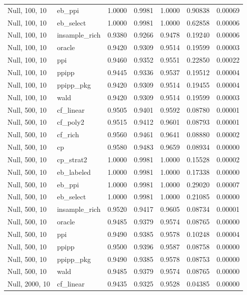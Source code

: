 \begin{longtable}{llrrrrr}
Null, 100, 10 & eb\_ppi & 1.0000 & 0.9981 & 1.0000 & 0.90838 & 0.00069 \\
Null, 100, 10 & eb\_select & 1.0000 & 0.9981 & 1.0000 & 0.62858 & 0.00006 \\
Null, 100, 10 & insample\_rich & 0.9380 & 0.9266 & 0.9478 & 0.19240 & 0.00006 \\
Null, 100, 10 & oracle & 0.9420 & 0.9309 & 0.9514 & 0.19599 & 0.00003 \\
Null, 100, 10 & ppi & 0.9460 & 0.9352 & 0.9551 & 0.22850 & 0.00022 \\
Null, 100, 10 & ppipp & 0.9445 & 0.9336 & 0.9537 & 0.19512 & 0.00004 \\
Null, 100, 10 & ppipp\_pkg & 0.9420 & 0.9309 & 0.9514 & 0.19455 & 0.00004 \\
Null, 100, 10 & wald & 0.9420 & 0.9309 & 0.9514 & 0.19599 & 0.00003 \\
Null, 500, 10 & cf\_linear & 0.9505 & 0.9401 & 0.9592 & 0.08780 & 0.00001 \\
Null, 500, 10 & cf\_poly2 & 0.9515 & 0.9412 & 0.9601 & 0.08793 & 0.00001 \\
Null, 500, 10 & cf\_rich & 0.9560 & 0.9461 & 0.9641 & 0.08880 & 0.00002 \\
Null, 500, 10 & cp & 0.9580 & 0.9483 & 0.9659 & 0.08934 & 0.00000 \\
Null, 500, 10 & cp\_strat2 & 1.0000 & 0.9981 & 1.0000 & 0.15528 & 0.00002 \\
Null, 500, 10 & eb\_labeled & 1.0000 & 0.9981 & 1.0000 & 0.17338 & 0.00000 \\
Null, 500, 10 & eb\_ppi & 1.0000 & 0.9981 & 1.0000 & 0.29020 & 0.00007 \\
Null, 500, 10 & eb\_select & 1.0000 & 0.9981 & 1.0000 & 0.21085 & 0.00000 \\
Null, 500, 10 & insample\_rich & 0.9520 & 0.9417 & 0.9605 & 0.08734 & 0.00001 \\
Null, 500, 10 & oracle & 0.9485 & 0.9379 & 0.9574 & 0.08765 & 0.00000 \\
Null, 500, 10 & ppi & 0.9490 & 0.9385 & 0.9578 & 0.10248 & 0.00004 \\
Null, 500, 10 & ppipp & 0.9500 & 0.9396 & 0.9587 & 0.08758 & 0.00000 \\
Null, 500, 10 & ppipp\_pkg & 0.9490 & 0.9385 & 0.9578 & 0.08753 & 0.00000 \\
Null, 500, 10 & wald & 0.9485 & 0.9379 & 0.9574 & 0.08765 & 0.00000 \\
Null, 2000, 10 & cf\_linear & 0.9435 & 0.9325 & 0.9528 & 0.04385 & 0.00000 \\

\end{longtable}

